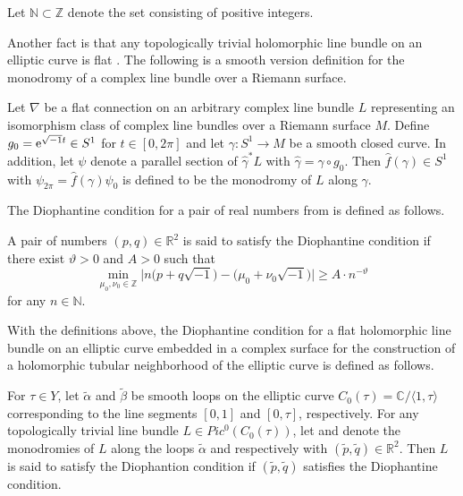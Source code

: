 \documentclass[10pt,a4paper]{amsart}
\numberwithin{equation}{section}
\def\operatorname#1{#1}
\begin{document}
Let $\mathbb{N} \subset \mathbb{Z} $ denote the set consisting of positive integers.

Another fact is that any topologically trivial holomorphic line bundle on an elliptic curve is flat \cite{Tetsuo}. The following is a smooth version definition for the monodromy of a complex line bundle over a Riemann surface.

\begin{Definition} \label{Definition2.1}
Let $\nabla$ be a flat connection on an arbitrary complex line bundle $L$ representing an isomorphism class of complex line bundles over a Riemann surface $M$. Define $g_0={\rm e}^{\sqrt{-1} t}\in S^1$ for $t\in [0,2 \pi ]$ and let $\gamma \colon S^1\to M$ be a smooth closed curve. In addition, let $\psi$ denote a parallel section of $\widehat{\gamma}^*L$ with $\widehat{\gamma}=\gamma \circ g_0 $. Then $\widehat{f}(\gamma)\in S^1$ with $\psi_{2\pi} =\widehat{f}(\gamma)\psi_0$ is defined to be the monodromy of $L$ along $\gamma$.
\end{Definition}

The Diophantine condition for a pair of real numbers from \cite{Takayuki-Takato2} is defined as follows.

\begin{Definition} \label{Definition2.2}
A pair of numbers $(p,q)\in \mathbb{R}^2$ is said to satisfy the Diophantine condition if there exist $\vartheta >0$ and $A>0$ such that
\[
\underset{\mu_0 ,\nu_0 \in \mathbb{Z}}{\min } \big| n\bigl(p+q\sqrt{-1} \bigr)-\bigl(\mu_0 +\nu_0\sqrt{-1} \bigr)\big| \geq A\cdot n^{-\vartheta }
\]
for any $n \in \mathbb{N}$.
\end{Definition}

With the definitions above, the Diophantine condition for a flat holomorphic line bundle on an elliptic curve embedded in a complex surface for the construction of a holomorphic tubular neighborhood of the elliptic curve is defined as follows.

\begin{Definition} \label{Definition2.3}
For $\tau\in Y$, let $\widetilde{\alpha}$ and $\widetilde{\beta}$ be smooth loops on the elliptic curve $C_0(\tau)=\mathbb{C}/ \langle 1,\tau \rangle$ corresponding to the line segments $[0,1]$ and $[0,\tau]$, respectively. For any topologically trivial line bundle $L\in \operatorname{Pic}^0(C_0(\tau))$, let  and  denote the monodromies of $L$ along the loops $\widetilde{\alpha}$ and \smash{$\widetilde{\beta}$} respectively with $(\widetilde{p},\widetilde{q})\in \mathbb{R}^2$. Then $L$ is said to satisfy the Diophantion condition if $(\widetilde{p},\widetilde{q})$ satisfies the Diophantine condition.
\end{Definition}
\end{document}
